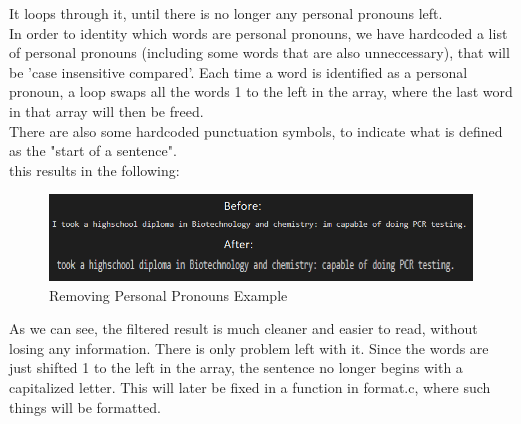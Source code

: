 It loops through it, until there is no longer any personal pronouns left.
\\
In order to identity which words are personal pronouns, we have hardcoded a list of personal pronouns\cite{english_personal_pronouns} (including some words that are also unneccessary), that will be 'case insensitive compared'.
Each time a word is identified as a personal pronoun, a loop swaps all the words 1 to the left in the array, where the last word in that array will then be freed.
\\
There are also some hardcoded punctuation symbols, to indicate what is defined as the "start of a sentence". 
\\
this results in the following:
\begin{figure}[H]
  \centering
  \includegraphics[scale = 0.6]{figures/personal_pronoun_ex.png}
  \caption{Removing Personal Pronouns Example}
\end{figure}

As we can see, the filtered result is much cleaner and easier to read, without losing any information.
There is only problem left with it. Since the words are just shifted 1 to the left in the array, the sentence no longer begins
with a capitalized letter. This will later be fixed in a function in format.c, where such things will be formatted.

